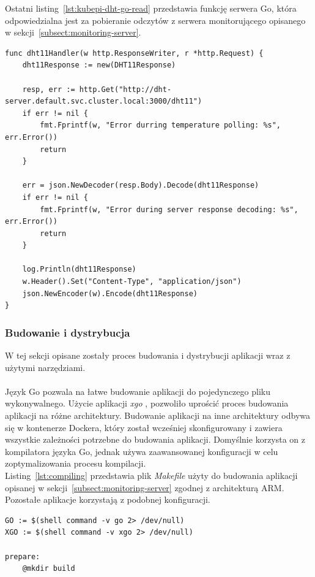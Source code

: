 \documentclass[12pt]{report}
\let\Oldsubsubsection\subsubsection
\renewcommand{\subsubsection}{\FloatBarrier\Oldsubsubsection}
\begin{document}
{\noindent Ostatni listing~\ref{lst:kubepi-dht-go-read} przedstawia funkcję serwera Go, która odpowiedzialna jest za pobieranie odczytów z serwera monitorującego opisanego w sekcji~\ref{subsect:monitoring-server}.
\begin{lstlisting}[language=golang,caption=Odczyt temperatury z naszego serwera,label=lst:kubepi-dht-go-read]
func dht11Handler(w http.ResponseWriter, r *http.Request) {
	dht11Response := new(DHT11Response)

	resp, err := http.Get("http://dht-server.default.svc.cluster.local:3000/dht11")
	if err != nil {
		fmt.Fprintf(w, "Error durring temperature polling: %s", err.Error())
		return
	}

	err = json.NewDecoder(resp.Body).Decode(dht11Response)
	if err != nil {
		fmt.Fprintf(w, "Error during server response decoding: %s", err.Error())
		return
	}

	log.Println(dht11Response)
	w.Header().Set("Content-Type", "application/json")
	json.NewEncoder(w).Encode(dht11Response)
}
\end{lstlisting}
\subsubsection{Budowanie i dystrybucja}
W tej sekcji opisane zostały proces budowania i dystrybucji aplikacji wraz z użytymi narzędziami. \\ \\
Język Go pozwala na łatwe budowanie aplikacji do pojedynczego pliku wykonywalnego. Użycie aplikacji \textit{xgo} \cite{xgo}, pozwoliło uprościć proces budowania aplikacji na różne architektury. Budowanie aplikacji na inne architektury odbywa się w kontenerze Dockera, który został wcześniej skonfigurowany i zawiera wszystkie zależności potrzebne do budowania aplikacji. Domyślnie korzysta on z kompilatora języka Go, jednak używa zaawansowanej konfiguracji w celu zoptymalizowania procesu kompilacji. \\

\noindent Listing~\ref{lst:compiling} przedstawia plik \textit{Makefile} użyty do budowania aplikacji opisanej w sekcji~\ref{subsect:monitoring-server} zgodnej z architekturą ARM. Pozostałe aplikacje korzystają z podobnej konfiguracji.
\begin{lstlisting}[caption=Makefile użyty do budowania aplikacji dla architektury ARM,label=lst:compiling]
GO := $(shell command -v go 2> /dev/null)
XGO := $(shell command -v xgo 2> /dev/null)

prepare:
	@mkdir build


\end{lstlisting}}
\end{document}

